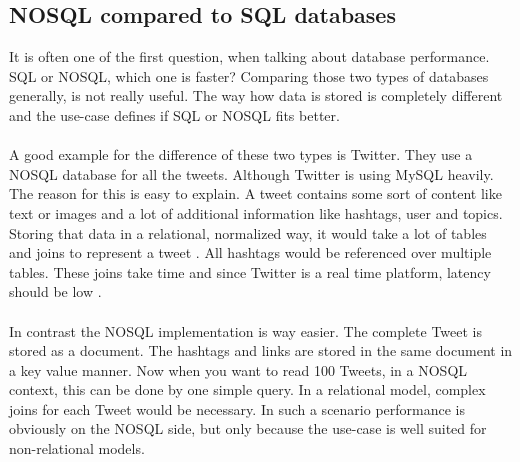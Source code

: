 \subsection{NOSQL compared to SQL databases}
It is often one of the first question, when talking about database performance. SQL or NOSQL, which one is faster? Comparing those two types of databases generally, is not really useful. The way how data is stored is completely different and the use-case defines if SQL or NOSQL fits better.
\\\\
A good example for the difference of these two types is Twitter. They use a NOSQL database for all the tweets. Although Twitter is using MySQL heavily. The reason for this is easy to explain. A tweet contains some sort of content like text or images and a lot of additional information like hashtags, user and topics. Storing that data in a relational, normalized way, it would take a lot of tables and joins to represent a tweet . All hashtags would be referenced over multiple tables. These joins take time and since Twitter is a real time platform, latency should be low \cite{Weil_21}.
\\\\
In contrast the NOSQL implementation is way easier. The complete Tweet is stored as a document. The hashtags and links are stored in the same document in a key value manner. Now when you want to read 100 Tweets, in a NOSQL context, this can be done by one simple query. In a relational model, complex joins for each Tweet would be necessary. In such a scenario performance is obviously on the NOSQL side, but only because the use-case is well suited for non-relational models.
